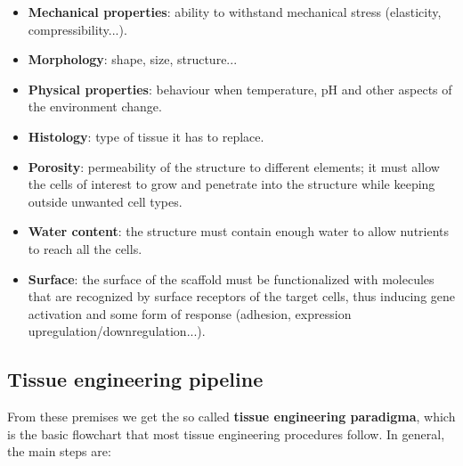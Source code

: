   \begin{multicols}{2}
    \begin{itemize}
      \item \textbf{Mechanical properties}: ability to withstand mechanical stress (elasticity, compressibility...).
      \item \textbf{Morphology}: shape, size, structure...
      \item \textbf{Physical properties}: behaviour when temperature, pH and other aspects of the environment change.
      \item \textbf{Histology}: type of tissue it has to replace.
      \item \textbf{Porosity}: permeability of the structure to different elements; it must allow the cells of interest to grow and penetrate into the structure while keeping outside unwanted cell types.
      \item \textbf{Water content}: the structure must contain enough water to allow nutrients to reach all the cells.
      \item \textbf{Surface}: the surface of the scaffold must be functionalized with molecules that are recognized by surface receptors of the target cells, thus inducing gene activation and some form of response (adhesion, expression upregulation/downregulation...).
    \end{itemize}
  \end{multicols}

  \subsection{Tissue engineering pipeline}
  From these premises we get the so called \textbf{tissue engineering paradigma}, which is the basic flowchart that most tissue engineering procedures follow.
  In general, the main steps are:

